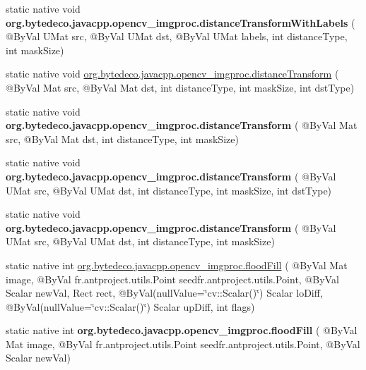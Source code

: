 \begin{DoxyCompactItemize}
static native void {\bfseries org.\+bytedeco.\+javacpp.\+opencv\+\_\+imgproc.\+distance\+Transform\+With\+Labels} ( @By\+Val U\+Mat src, @By\+Val U\+Mat dst, @By\+Val U\+Mat labels, int distance\+Type, int mask\+Size)
\item 
static native void \hyperlink{group__imgproc__misc_ga8d767320bf0a4f3bbeebe751dbd2f3d7}{org.\+bytedeco.\+javacpp.\+opencv\+\_\+imgproc.\+distance\+Transform} ( @By\+Val Mat src, @By\+Val Mat dst, int distance\+Type, int mask\+Size, int dst\+Type)
\item 
\mbox{\label{group__imgproc__misc_gaafb2648fb2ef6bd1744373b552d73481}} 
static native void {\bfseries org.\+bytedeco.\+javacpp.\+opencv\+\_\+imgproc.\+distance\+Transform} ( @By\+Val Mat src, @By\+Val Mat dst, int distance\+Type, int mask\+Size)
\item 
\mbox{\label{group__imgproc__misc_gaa9ce9c56bdadbeb9f96047d6fc0ccaa7}} 
static native void {\bfseries org.\+bytedeco.\+javacpp.\+opencv\+\_\+imgproc.\+distance\+Transform} ( @By\+Val U\+Mat src, @By\+Val U\+Mat dst, int distance\+Type, int mask\+Size, int dst\+Type)
\item 
\mbox{\label{group__imgproc__misc_ga7033711a6d14a8d8e102fe9e79a7d4da}} 
static native void {\bfseries org.\+bytedeco.\+javacpp.\+opencv\+\_\+imgproc.\+distance\+Transform} ( @By\+Val U\+Mat src, @By\+Val U\+Mat dst, int distance\+Type, int mask\+Size)
\item 
static native int \hyperlink{group__imgproc__misc_gacd62f4ba0b1bf1f4664bfd1a3dd1bd08}{org.\+bytedeco.\+javacpp.\+opencv\+\_\+imgproc.\+flood\+Fill} ( @By\+Val Mat image, @By\+Val fr.antproject.utils.Point seed\+fr.antproject.utils.Point, @By\+Val Scalar new\+Val, Rect rect, @By\+Val(null\+Value=\char`\"{}cv\+::\+Scalar()\char`\"{}) Scalar lo\+Diff, @By\+Val(null\+Value=\char`\"{}cv\+::\+Scalar()\char`\"{}) Scalar up\+Diff, int flags)
\item 
\mbox{\label{group__imgproc__misc_ga77f9a45a75b473ba1e5969b6a3cf2a9f}} 
static native int {\bfseries org.\+bytedeco.\+javacpp.\+opencv\+\_\+imgproc.\+flood\+Fill} ( @By\+Val Mat image, @By\+Val fr.antproject.utils.Point seed\+fr.antproject.utils.Point, @By\+Val Scalar new\+Val)
\item 
\mbox{\label{group__imgproc__misc_gad2faadef83d138979a03da751e0eea87}} 

\end{DoxyCompactItemize}
